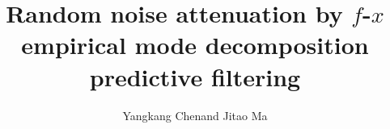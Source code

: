 
\title{Random noise attenuation by $f$-$x$ empirical mode decomposition predictive filtering }

\renewcommand{\thefootnote}{\fnsymbol{footnote}}

\author{Yangkang Chen\footnotemark[1] and Jitao Ma\footnotemark[2]}


\address{
\footnotemark[1]Bureau of Economic Geology \\
John A. and Katherine G. Jackson School of Geosciences \\
The University of Texas at Austin \\
University Station, Box X \\
Austin, TX 78713-8924 \\
\footnotemark[2] State Key Laboratory of Petroleum Resources and Prospecting \\
China University of Petroleum \\
Fuxue Road 18th\\
Beijing, China, 102200
}



\DeclareRobustCommand{\dlo}[1]{}
\DeclareRobustCommand{\wen}[1]{#1}%


